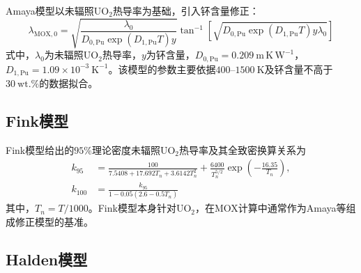 Amaya模型以未辐照$\mathrm{UO}_2$热导率为基础，引入钚含量修正：
\begin{equation}
	\lambda_{\mathrm{MOX},0}
	=\sqrt{
	\frac{\lambda_0}
	{D_{0,\mathrm{Pu}}\exp(D_{1,\mathrm{Pu}}T)y}}
	\tan^{-1}\!\left[
	\sqrt{D_{0,\mathrm{Pu}}\exp(D_{1,\mathrm{Pu}}T)y\lambda_0}
	\right]
	\label{eq:appendix_amaya_thermal_conductivity}
\end{equation}
式中，$\lambda_0$为未辐照$\mathrm{UO}_2$热导率，$y$为钚含量，$D_{0,\mathrm{Pu}}=0.209\ \mathrm{m\,K\,W^{-1}}$，$D_{1,\mathrm{Pu}}=1.09\times10^{-3}\ \mathrm{K^{-1}}$。该模型的参数主要依据$400$--$1500\ \mathrm{K}$及钚含量不高于$30\ \mathrm{wt.\%}$的数据拟合。

\subsection{Fink模型}

Fink模型给出的$95\%$理论密度未辐照$\mathrm{UO}_2$热导率及其全致密换算关系为
\begin{equation}
	\begin{aligned}
		k_{95}
		&=
		\frac{100}{7.5408+17.692T_n+3.6142T_n^2}
		+\frac{6400}{T_n^{5/2}}
		\exp\!\left(-\frac{16.35}{T_n}\right),\\
		k_{100}
		&=
		\frac{k_{95}}
		{1-0.05\left(2.6-0.5T_n\right)}
	\end{aligned}
	\label{eq:appendix_fink_k95}
\end{equation}
\label{eq:appendix_fink_k100}
其中，$T_n=T/1000$。Fink模型本身针对$\mathrm{UO}_2$，在MOX计算中通常作为Amaya等组成修正模型的基准。

\subsection{Halden模型}

